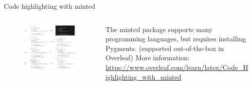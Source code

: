 \begin{frame}[fragile]{Code highlighting with minted}
\vspace{.5cm}
	\begin{columns}[t]
		\begin{column}{.6\textwidth}
            \begin{figure}
                \centering
                \includegraphics[width=\linewidth]{Figures/minted.png}
            \end{figure}
		\end{column} 
		\begin{column}{.4\textwidth}
			The minted package supports many programming languages, but requires installing Pygments. (supported out-of-the-box in Overleaf)
			\somespace
			More information: \url{https://www.overleaf.com/learn/latex/Code_Highlighting_with_minted}
		\end{column}
	\end{columns}	
\end{frame}

